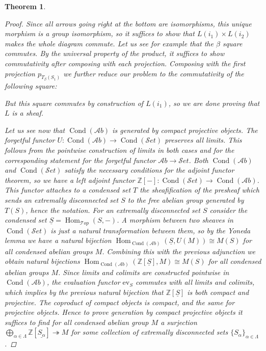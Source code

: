 \documentclass[11pt,A4]{article}
\theoremstyle{plain}
\newtheorem{thm}{Theorem}[section]
\theoremstyle{definition}
\theoremstyle{remark}
\newcommand{\Z}{\mathbb{Z}}
\newcommand{\1}{\mathbbm{1}}
\newcommand{\Top}{\mathscr{T}op}
\newcommand{\Ab}{\mathscr{A}b}
\newcommand{\Set}{\mathscr{S}et}
\DeclareMathOperator{\Hom}{Hom}
\DeclareMathOperator{\Cond}{Cond}
\renewcommand{\u}[1]{\underline{#1}}
\newcommand{\ev}{\mathrm{ev}}
\begin{document}
\begin{thm}
\begin{proof}
	Since all arrows going right at the bottom are isomorphisms, this unique morphism is a group isomorphism, so it suffices to show that $L(i_{1})\times L(i_{2})$ makes the whole diagram commute.
	Let us see for example that the $\beta$ square commutes.
	By the universal property of the product, it suffices to show commutativity after composing with each projection.
	Composing with the first projection $p_{T_{\beta}(S_{1})}$ we further reduce our problem to the commutativity of the following square:
	\begin{center}
	\end{center}
	But this square commutes by construction of $L(i_{1})$, so we are done proving that $L$ is a sheaf.

	Let us see now that $\Cond(\Ab)$ is generated by compact projective objects.
	The forgetful functor $U\colon \Cond(\Ab)\to \Cond(\Set)$ preserves all limits.
	This follows from the pointwise construction of limits in both cases and for the corresponding statement for the forgetful functor $\Ab\to \Set$.
	Both $\Cond(\Ab)$ and $\Cond(\Set)$ satisfy the necessary conditions for the adjoint functor theorem, so we have a left adjoint functor $\Z[-]\colon\Cond(\Set)\to \Cond(\Ab)$.
	This functor attaches to a condensed set $T$ the sheafification of the presheaf which sends an extremally disconnected set $S$ to the free abelian group generated by $T(S)$, hence the notation.
	For an extremally disconnected set $S$ consider the condensed set $\u{S}=\Hom_{\Top}(S,-)$.
	A morphism between two sheaves in $\Cond(\Set)$ is just a natural transformation between them, so by the Yoneda lemma we have a natural bijection $\Hom_{\Cond(\Ab)}(\u{S},U(M))\cong M(S)$ for all condensed abelian groups $M$.
	Combining this with the previous adjunction we obtain natural bijections $\Hom_{\Cond(\Ab)}(\Z[\u{S}],M)\cong M(S)$ for all condensed abelian groups $M$.
	Since limits and colimits are constructed pointwise in $\Cond(\Ab)$, the evaluation functor $\ev_{S}$ commutes with all limits and colimits, which implies by the previous natural bijection that $\Z[\u{S}]$ is both compact and projective.
	The coproduct of compact objects is compact, and the same for projective objects.
	Hence to prove generation by compact projective objects it suffices to find for all condensed abelian group $M$ a surjection $\bigoplus_{\alpha \in \Lambda}\Z[\u{S_{\alpha}}]\twoheadrightarrow M$ for some collection of extremally disconnected sets $\{S_{\alpha}\}_{\alpha\in \Lambda}$.
	

\end{proof}
\end{thm}
\end{document}
